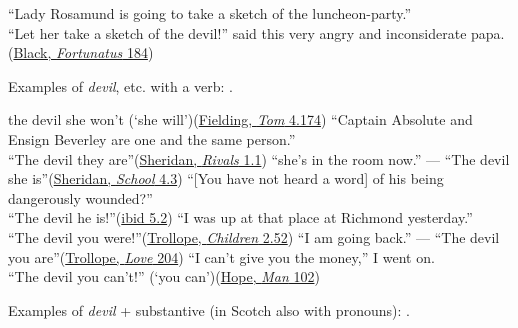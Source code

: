 \ea \label{ex:04-165}
``Lady Rosamund is going to take a sketch of the luncheon-party.''\\``Let her take a sketch of the devil!'' said this very angry and inconsiderate papa.\hfill(\href{https://www.gutenberg.org/files/16217/16217-h/16217-h.htm}{Black, \textit{Fortunatus} 184}) %
\z

Examples of \textit{devil}, etc. with a verb: .

\ea \label{ex:04-166}
\ea
the devil she won't  \phantom{x} (`she will')\hfill(\href{https://archive.org/details/bim_eighteenth-century_the-history-of-tom-jones_fielding-henry_1768_4/page/174/mode/2up?q=\%22devil+%C5%BFhe\%22&view=theater}{Fielding, \textit{Tom} 4.174})
\ex
``Captain Absolute and Ensign Beverley are one and the same person.''\\``The devil they are''\hfill(\href{https://archive.org/details/playsofsheridanc00sheruoft/page/6/mode/2up?q=\%22captain+absolute+and\%22&view=theater}{Sheridan, \textit{Rivals} 1.1}) %
\ex
``she's in the room now.'' --- ``The devil she is''\hfill(\href{https://archive.org/details/playsofsheridanc00sheruoft/page/140/mode/2up?q=\%22in+the+room+now\%22&view=theater}{Sheridan, \textit{School} 4.3})
\ex
``{[}You have not heard a word{]} of his being dangerously wounded?''\\``The devil he is!''\hfill(\href{https://archive.org/details/playsofsheridanc00sheruoft/page/150/mode/2up?q=\%22the+devil\%22&view=theater}{ibid 5.2}) %
\ex
``I was up at that place at Richmond yesterday.''\\``The devil you were!''\hfill(\href{https://archive.org/details/dukeschildrennov00troluoft/page/178/mode/2up?q=\%22at+that+place+at+richmond\%22&view=theater}{Trollope, \textit{Children} 2.52}) %
\ex
``I am going back.'' --- ``The devil you are''\hfill(\href{https://archive.org/details/anoldmanslove01trolgoog/page/n112/mode/2up?q=\%22devil+you+are\%22&view=theater}{Trollope, \textit{Love} 204})
\ex
``I can't give you the money,'' I went on.\\``The devil you can't!'' \phantom{x} (`you can')\hfill(\href{https://archive.org/details/manofmark00hope/page/182/mode/2up?q=\%22give+you+the+money\%22&view=theater}{Hope, \textit{Man} 102}) %
\z
\z

Examples of \textit{devil} + substantive (in Scotch also with pronouns): .

